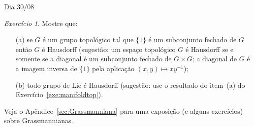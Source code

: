 \documentclass[oneside,11pt]{amsart}
\theoremstyle{remark}\newtheorem{exercise}{Exercício}[section]
\theoremstyle{plain}\newtheorem{teo}{Teorema}[section]
\theoremstyle{plain}\newtheorem{lem}[teo]{Lema}
\theoremstyle{plain}\newtheorem{prop}[teo]{Proposição}
\theoremstyle{definition}\newtheorem{defin}[teo]{Definição}
\theoremstyle{remark}\newtheorem{rem}[teo]{Observação}
\theoremstyle{definition}\newtheorem{example}[teo]{Exemplo}
\numberwithin{equation}{section}
\begin{document}
\begin{section}{Dia 30/08}
\begin{exercise}
Mostre que:
\begin{itemize}
\item[(a)] se $G$ é um grupo topológico tal que $\{1\}$ é um subconjunto fechado de $G$ então $G$ é Hausdorff (sugestão: um espaço topológico
$G$ é Hausdorff se e somente se a diagonal é um subconjunto fechado de $G\times G$; a diagonal de $G$ é a imagem inversa de $\{1\}$ pela aplicação
$(x,y)\mapsto xy^{-1}$);
\item[(b)] todo grupo de Lie é Hausdorff (sugestão: use o resultado do item~(a) do Exercício~\ref{exe:manifoldtop}).
\end{itemize}
\end{exercise}

Veja o Apêndice~\ref{sec:Grassmanniana} para uma exposição (e alguns exercícios) sobre Grassmannianas.

\end{section}
\end{document}
